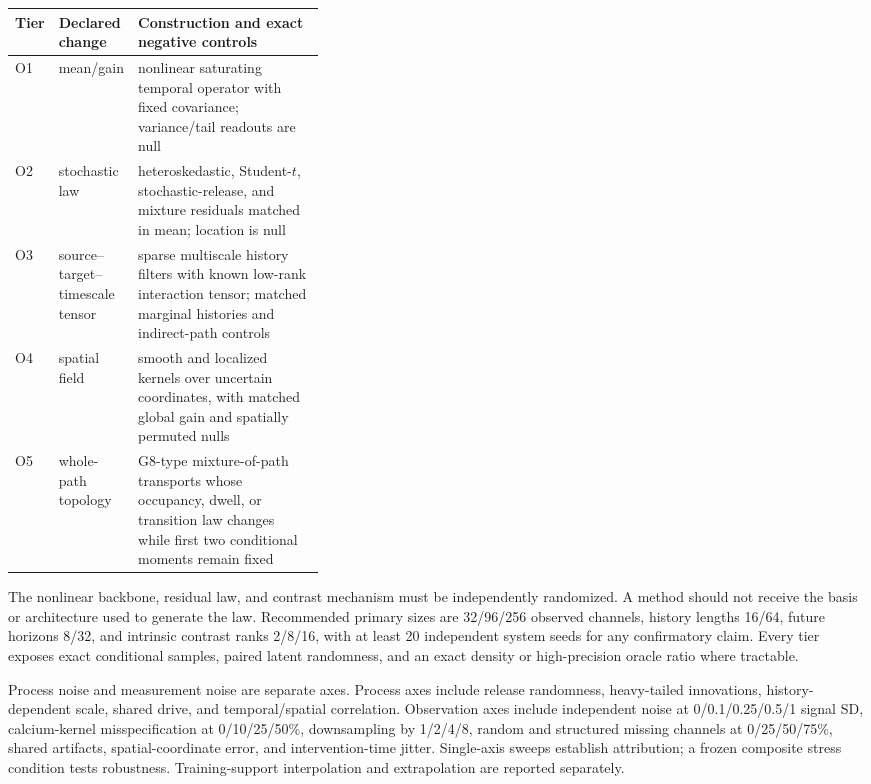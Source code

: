 \documentclass[10pt]{article}
\begin{document}
\begin{center}
\begin{tabularx}{\linewidth}{@{}p{0.11\linewidth}p{0.25\linewidth}X@{}}
\toprule
Tier & Declared change & Construction and exact negative controls \\
\midrule
O1 & mean/gain & nonlinear saturating temporal operator with fixed covariance; variance/tail readouts are null \\
O2 & stochastic law & heteroskedastic, Student-$t$, stochastic-release, and mixture residuals matched in mean; location is null \\
O3 & source--target--timescale tensor & sparse multiscale history filters with known low-rank interaction tensor; matched marginal histories and indirect-path controls \\
O4 & spatial field & smooth and localized kernels over uncertain coordinates, with matched global gain and spatially permuted nulls \\
O5 & whole-path topology & G8-type mixture-of-path transports whose occupancy, dwell, or transition law changes while first two conditional moments remain fixed \\
\bottomrule
\end{tabularx}
\end{center}

The nonlinear backbone, residual law, and contrast mechanism must be independently
randomized.  A method should not receive the basis or architecture used to
generate the law.  Recommended primary sizes are 32/96/256 observed channels,
history lengths 16/64, future horizons 8/32, and intrinsic contrast ranks
2/8/16, with at least 20 independent system seeds for any confirmatory claim.
Every tier exposes exact conditional samples, paired latent randomness, and an
exact density or high-precision oracle ratio where tractable.

Process noise and measurement noise are separate axes.  Process axes include
release randomness, heavy-tailed innovations, history-dependent scale, shared
drive, and temporal/spatial correlation.  Observation axes include independent
noise at 0/0.1/0.25/0.5/1 signal SD, calcium-kernel misspecification at
0/10/25/50\%, downsampling by 1/2/4/8, random and structured missing channels at
0/25/50/75\%, shared artifacts, spatial-coordinate error, and intervention-time
jitter.  Single-axis sweeps establish attribution; a frozen composite stress
condition tests robustness.  Training-support interpolation and extrapolation
are reported separately.
\end{document}
